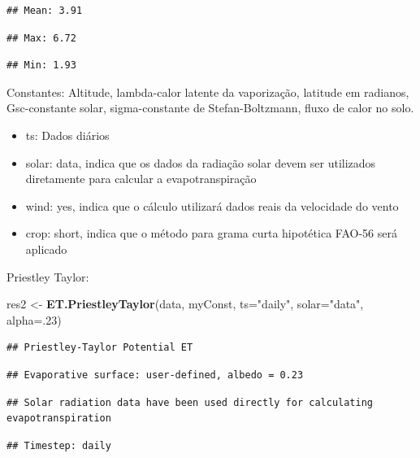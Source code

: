\documentclass[
]{book}
\newenvironment{Shaded}{\begin{snugshade}}{\end{snugshade}}
\newcommand{\DataTypeTok}[1]{\textcolor[rgb]{0.13,0.29,0.53}{#1}}
\newcommand{\DecValTok}[1]{\textcolor[rgb]{0.00,0.00,0.81}{#1}}
\newcommand{\KeywordTok}[1]{\textcolor[rgb]{0.13,0.29,0.53}{\textbf{#1}}}
\newcommand{\NormalTok}[1]{#1}
\newcommand{\StringTok}[1]{\textcolor[rgb]{0.31,0.60,0.02}{#1}}
\providecommand{\tightlist}{%
  \setlength{\itemsep}{0pt}\setlength{\parskip}{0pt}}
\begin{document}
\begin{verbatim}
## Mean: 3.91
\end{verbatim}

\begin{verbatim}
## Max: 6.72
\end{verbatim}

\begin{verbatim}
## Min: 1.93
\end{verbatim}

Constantes: Altitude, lambda-calor latente da vaporização, latitude em radianos, Gsc-constante solar, sigma-constante de Stefan-Boltzmann, fluxo de calor no solo.

\begin{itemize}
\tightlist
\item
  ts: Dados diários
\item
  solar: data, indica que os dados da radiação solar devem ser utilizados diretamente para calcular a evapotranspiração
\item
  wind: yes, indica que o cálculo utilizará dados reais da velocidade do vento
\item
  crop: short, indica que o método para grama curta hipotética FAO-56 será aplicado
\end{itemize}

Priestley Taylor:

\begin{Shaded}
\begin{Highlighting}[]
\NormalTok{res2 <-}\StringTok{ }\KeywordTok{ET.PriestleyTaylor}\NormalTok{(data, myConst, }\DataTypeTok{ts=}\StringTok{"daily"}\NormalTok{, }\DataTypeTok{solar=}\StringTok{"data"}\NormalTok{, }\DataTypeTok{alpha=}\NormalTok{.}\DecValTok{23}\NormalTok{)}
\end{Highlighting}
\end{Shaded}

\begin{verbatim}
## Priestley-Taylor Potential ET
\end{verbatim}

\begin{verbatim}
## Evaporative surface: user-defined, albedo = 0.23
\end{verbatim}

\begin{verbatim}
## Solar radiation data have been used directly for calculating evapotranspiration
\end{verbatim}

\begin{verbatim}
## Timestep: daily
\end{verbatim}
\end{document}
